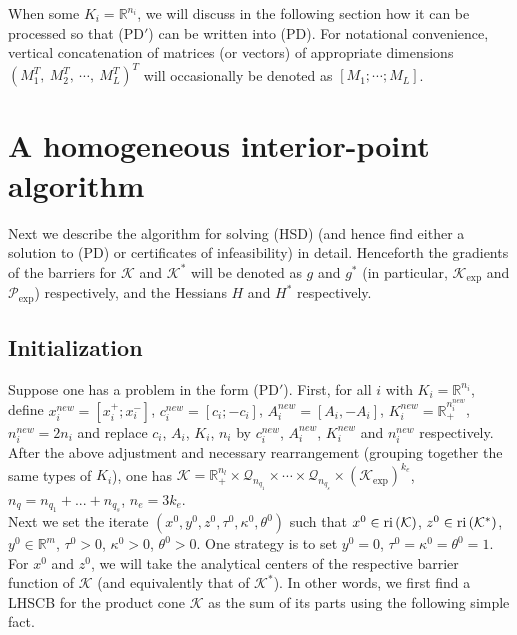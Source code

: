 \documentclass[10pt]{article}
\theoremstyle{definition}
\theoremstyle{plain}
\def\interior{\protect{\textnormal{ri}}}
\begin{document}
When some $K_i = \mathbb{R}^{n_i}$, we will discuss in the following section how it can be processed so that (PD$'$) can be written into (PD). For notational convenience, vertical concatenation of matrices (or vectors) of appropriate dimensions $(M_1^T,\ M_2^T,\ \cdots,\ M_L^T)^T$ will occasionally be denoted as $[M_1; \cdots ; M_L]$.

\section{A homogeneous interior-point algorithm}
Next we describe the algorithm for solving (HSD) (and hence find either a solution to (PD) or certificates of infeasibility) in detail. Henceforth the gradients of the barriers for $\mathcal{K}$ and $\mathcal{K}^*$ will be denoted as $g$ and $g^*$ (in particular, $\mathcal{K}_{\exp}$ and $\mathcal{P}_{\exp}$) respectively, and the Hessians $H$ and $H^*$ respectively.
\subsection{Initialization}

Suppose one has a problem in the form (PD$'$). First, for all $i$ with $K_i = \mathbb{R}^{n_i}$, define $x_i^{new} = [x_i^+; x_i^-]$, $c_i^{new} = [c_i; -c_i]$, $A_i^{new} = [A_i, -A_i]$, $K_i^{new} = \mathbb{R}_+^{n_i^{new}}$, $n_i^{new} = 2n_i$ and replace $c_i$, $A_i$, $K_i$, $n_i$ by $c_i^{new}$, $A_i^{new}$, $K_i^{new}$ and $n_i^{new}$ respectively. After the above adjustment and necessary rearrangement (grouping together the same types of $K_i$), one has $\mathcal{K} = \mathbb{R}_+^{n_l} \times \mathcal{Q}_{n_{q_1}} \times \cdots \times \mathcal{Q}_{n_{q_s}} \times \left(\mathcal{K}_{\exp}\right)^{k_e}$, $n_q = n_{q_1} + ... + n_{q_s}$, $n_e = 3k_e$. \\

Next we set the iterate $(x^0,y^0, z^0, \tau^0, \kappa^0, \theta^0)$ such that $x^0 \in \interior\left(\mathcal{K}\right)$, $z^0 \in \interior\left(\mathcal{K}^*\right)$, $y^0 \in \mathbb{R}^m$, $\tau^0 > 0$, $\kappa^0 > 0$, $\theta^0>0$. One strategy is to set $y^0 = 0$, $\tau^0 = \kappa^0 = \theta^0 = 1$. For $x^0$ and $z^0$, we will take the analytical centers of the respective barrier function of $\mathcal{K}$ (and equivalently that of $\mathcal{K}^*$). In other words, we first find a LHSCB for the product cone $\mathcal{K}$ as the sum of its parts using the following simple fact.
\end{document}
